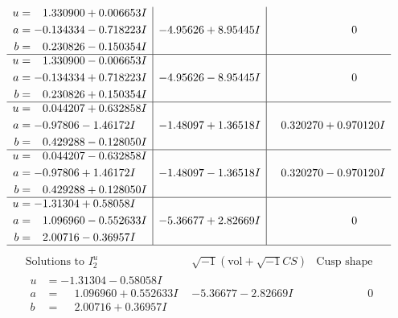 \documentclass[1p]{elsarticle_modified}
\theoremstyle{definition}
\newcommand{\I}{\sqrt{-1}}
\begin{document}
$$\begin{array}{c|c|c}
\begin{aligned}
u &= \phantom{-}1.330900 + 0.006653 I \\
a &= -0.134334 - 0.718223 I \\
b &= \phantom{-}0.230826 - 0.150354 I\end{aligned}
 & -4.95626 + 8.95445 I & \phantom{-0.000000 } 0 \\ \hline\begin{aligned}
u &= \phantom{-}1.330900 - 0.006653 I \\
a &= -0.134334 + 0.718223 I \\
b &= \phantom{-}0.230826 + 0.150354 I\end{aligned}
 & -4.95626 - 8.95445 I & \phantom{-0.000000 } 0 \\ \hline\begin{aligned}
u &= \phantom{-}0.044207 + 0.632858 I \\
a &= -0.97806 - 1.46172 I \\
b &= \phantom{-}0.429288 - 0.128050 I\end{aligned}
 & -1.48097 + 1.36518 I & \phantom{-}0.320270 + 0.970120 I \\ \hline\begin{aligned}
u &= \phantom{-}0.044207 - 0.632858 I \\
a &= -0.97806 + 1.46172 I \\
b &= \phantom{-}0.429288 + 0.128050 I\end{aligned}
 & -1.48097 - 1.36518 I & \phantom{-}0.320270 - 0.970120 I \\ \hline\begin{aligned}
u &= -1.31304 + 0.58058 I \\
a &= \phantom{-}1.096960 - 0.552633 I \\
b &= \phantom{-}2.00716 - 0.36957 I\end{aligned}
 & -5.36677 + 2.82669 I & \phantom{-0.000000 } 0\\
 \hline 
 \end{array}$$\newpage$$\begin{array}{c|c|c}  
\text{Solutions to }I^u_{2}& \I (\text{vol} + \sqrt{-1}CS) & \text{Cusp shape}\\
 \hline 
\begin{aligned}
u &= -1.31304 - 0.58058 I \\
a &= \phantom{-}1.096960 + 0.552633 I \\
b &= \phantom{-}2.00716 + 0.36957 I\end{aligned}
 & -5.36677 - 2.82669 I & \phantom{-0.000000 } 0 \\ \hline\begin{aligned}

\end{aligned}
\end{array}$$
\end{document}
